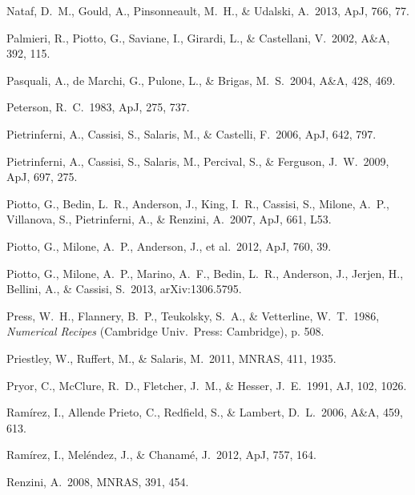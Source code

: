 \documentclass[12pt,preprint]{aastex}
\begin{document}
\begin{thebibliography}{}
Nataf, D.~M., Gould, A., Pinsonneault, M.~H., \& Udalski, A.~2013, ApJ, 766, 
 77.

Palmieri, R., Piotto, G., Saviane, I., Girardi, L., \& Castellani, V.~2002,
 A\&A, 392,  115.

Pasquali, A., de Marchi, G., Pulone, L., \& Brigas, M.~S.~2004, A\&A, 428, 469.

Peterson, R.~C.~1983, ApJ, 275, 737.

Pietrinferni, A., Cassisi, S., Salaris, M., \& Castelli, F.~2006, ApJ, 642,
 797.

Pietrinferni, A., Cassisi, S., Salaris, M., Percival, S., \& Ferguson,
 J.~W.~2009, ApJ, 697, 275.

Piotto, G., Bedin, L.~R., Anderson, J., King, I.~R., Cassisi, S., Milone, A.~P.,
 Villanova, S., Pietrinferni, A., \& Renzini, A.~2007, ApJ, 661, L53.

Piotto, G., Milone, A.~P., Anderson, J., et al.~2012, ApJ, 760, 39.

Piotto, G., Milone, A.~P., Marino, A.~F., Bedin, L.~R., Anderson, J., Jerjen,
 H., Bellini, A., \& Cassisi, S.~2013, arXiv:1306.5795.

Press, W.~H., Flannery, B.~P., Teukolsky, S.~A., \& Vetterline, W.~T.~1986,
 {\it Numerical Recipes} (Cambridge Univ.~Press: Cambridge), p. 508.

Priestley, W., Ruffert, M., \& Salaris, M.~2011, MNRAS, 411, 1935.

Pryor, C., McClure, R.~D., Fletcher, J.~M., \& Hesser, J.~E.~1991, AJ, 102,
 1026.


Ram\'irez, I., Allende Prieto, C., Redfield, S., \& Lambert, D.~L.~2006, A\&A,
 459, 613.

Ram\'irez, I., Mel\'endez, J., \& Chanam\'e, J.~2012, ApJ, 757, 164.

Renzini, A.~2008, MNRAS, 391, 454.


\end{thebibliography}
\end{document}
